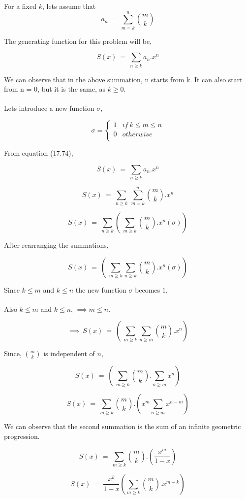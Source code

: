 For a fixed $k$, lets assume that $$a_n~=~\sum_{m=k}^{n}{m \choose k} $$

The generating function for this problem will be,

\begin{equation}
 S(x)~=~ \sum_{n \geq k}a_n.x^n
\end{equation}

We can observe that in the above summation, n starts from k. It can also start from n = 0, but it is the same, as $k \geq 0$. \\ \\
Lets introduce a new function $\sigma$,

$$ \sigma = \left\{
\begin{array}{ll}
      1 & if~k\leq m\leq n \\
      0 & otherwise \\
\end{array} 
\right. $$

From equation (17.74),

$$ S(x)~=~ \sum_{n \geq k}a_n.x^n$$

$$ S(x)~=~ \sum_{n \geq k}~\sum_{m=k}^{n}{m \choose k}.x^n$$

$$ S(x)~=~ \sum_{n \geq k}\left(~\sum_{m \geq k}{m \choose k}.x^n\left(\sigma \right) \right)$$

After rearranging the summations,

$$ S(x)~=~ \left(~\sum_{m \geq k}\sum_{n \geq k}{m \choose k}.x^n\left(\sigma \right) \right)$$

Since ${k \leq m}$ and ${k \leq n}$ the new function $\sigma$ becomes $1$.\\ \\
Also ${k \leq m}$ and ${k \leq n}$, $\implies m \leq n$.

$$\implies~S(x)~=~ \left(~\sum_{m \geq k}\sum_{n \geq m}{m \choose k}.x^n \right)$$

Since, ${m \choose k}$ is independent of $n$,

$$S(x)~=~ \left(~\sum_{m \geq k}{m \choose k}. \sum_{n \geq m}x^n \right)$$

$$S(x)~=~\sum_{m \geq k}{m \choose k}.\left(x^m \sum_{n \geq m}x^{n-m} \right) $$

We can observe that the second summation is the sum of an infinite geometric progression.

$$S(x)~=~\sum_{m \geq k}{m \choose k}.\left( \frac{x^m}{1-x} \right)$$

\begin{equation}
	S(x)~=~\frac{x^k}{1-x} \left(\sum_{m \geq k} {m \choose k}.x^{m-k} \right)
\end{equation}

